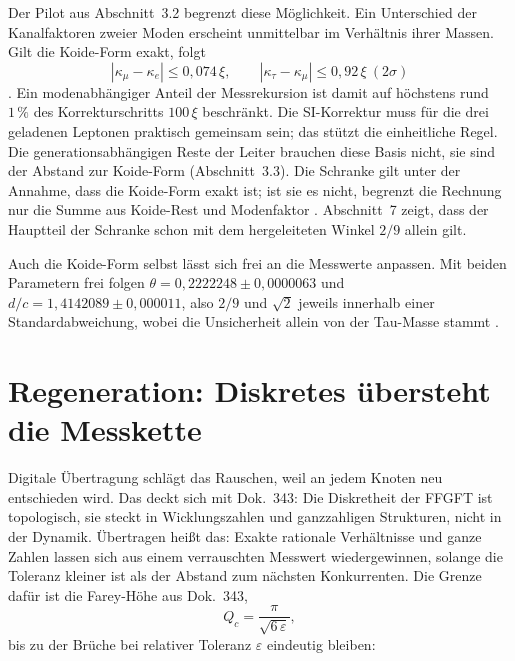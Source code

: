 Der Pilot aus Abschnitt~3.2 begrenzt diese Möglichkeit. Ein Unterschied der Kanalfaktoren zweier Moden
erscheint unmittelbar im Verhältnis ihrer Massen. Gilt die Koide-Form exakt, folgt
\begin{equation}
  |\kappa_\mu-\kappa_e|\le0{,}074\,\xi,\qquad |\kappa_\tau-\kappa_\mu|\le0{,}92\,\xi\ (2\sigma)
\end{equation}
\KM. Ein modenabhängiger Anteil der Messrekursion ist damit auf höchstens rund $1\,\%$ des
Korrekturschritts $100\,\xi$ beschränkt. Die SI-Korrektur muss für die drei geladenen Leptonen
praktisch gemeinsam sein; das stützt die einheitliche Regel. Die generationsabhängigen Reste der Leiter
brauchen diese Basis nicht, sie sind der Abstand zur Koide-Form (Abschnitt~3.3). Die Schranke gilt
unter der Annahme, dass die Koide-Form exakt ist; ist sie es nicht, begrenzt die Rechnung nur die Summe
aus Koide-Rest und Modenfaktor \SM. Abschnitt~7 zeigt, dass der Hauptteil der Schranke schon mit dem
hergeleiteten Winkel $2/9$ allein gilt.

Auch die Koide-Form selbst lässt sich frei an die Messwerte anpassen. Mit beiden Parametern frei folgen
$\theta=0{,}2222248\pm0{,}0000063$ und $d/c=1{,}4142089\pm0{,}000011$, also $2/9$ und $\sqrt2$ jeweils
innerhalb einer Standardabweichung, wobei die Unsicherheit allein von der Tau-Masse stammt \KM.

\section{Regeneration: Diskretes übersteht die Messkette}

Digitale Übertragung schlägt das Rauschen, weil an jedem Knoten neu entschieden wird. Das deckt sich
mit Dok.~343: Die Diskretheit der FFGFT ist topologisch, sie steckt in Wicklungszahlen und
ganzzahligen Strukturen, nicht in der Dynamik. Übertragen heißt das: Exakte rationale Verhältnisse
und ganze Zahlen lassen sich aus einem verrauschten Messwert wiedergewinnen, solange die Toleranz
kleiner ist als der Abstand zum nächsten Konkurrenten. Die Grenze dafür ist die Farey-Höhe aus
Dok.~343,
\begin{equation}
  Q_c=\frac{\pi}{\sqrt{6\,\varepsilon}} ,
\end{equation}
bis zu der Brüche bei relativer Toleranz $\varepsilon$ eindeutig bleiben:


